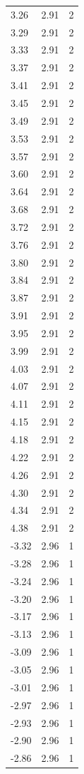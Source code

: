 \begin{longtable}{lrr}
  3.26 & 2.91 & 2 \\
  3.29 & 2.91 & 2 \\
  3.33 & 2.91 & 2 \\
  3.37 & 2.91 & 2 \\
  3.41 & 2.91 & 2 \\
  3.45 & 2.91 & 2 \\
  3.49 & 2.91 & 2 \\
  3.53 & 2.91 & 2 \\
  3.57 & 2.91 & 2 \\
  3.60 & 2.91 & 2 \\
  3.64 & 2.91 & 2 \\
  3.68 & 2.91 & 2 \\
  3.72 & 2.91 & 2 \\
  3.76 & 2.91 & 2 \\
  3.80 & 2.91 & 2 \\
  3.84 & 2.91 & 2 \\
  3.87 & 2.91 & 2 \\
  3.91 & 2.91 & 2 \\
  3.95 & 2.91 & 2 \\
  3.99 & 2.91 & 2 \\
  4.03 & 2.91 & 2 \\
  4.07 & 2.91 & 2 \\
  4.11 & 2.91 & 2 \\
  4.15 & 2.91 & 2 \\
  4.18 & 2.91 & 2 \\
  4.22 & 2.91 & 2 \\
  4.26 & 2.91 & 2 \\
  4.30 & 2.91 & 2 \\
  4.34 & 2.91 & 2 \\
  4.38 & 2.91 & 2 \\
  -3.32 & 2.96 & 1 \\
  -3.28 & 2.96 & 1 \\
  -3.24 & 2.96 & 1 \\
  -3.20 & 2.96 & 1 \\
  -3.17 & 2.96 & 1 \\
  -3.13 & 2.96 & 1 \\
  -3.09 & 2.96 & 1 \\
  -3.05 & 2.96 & 1 \\
  -3.01 & 2.96 & 1 \\
  -2.97 & 2.96 & 1 \\
  -2.93 & 2.96 & 1 \\
  -2.90 & 2.96 & 1 \\
  -2.86 & 2.96 & 1 \\

\end{longtable}
